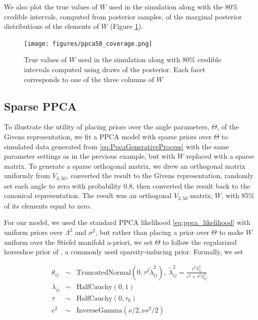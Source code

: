 \documentclass[ba]{imsart}
\numberwithin{equation}{section}
\theoremstyle{plain}
\begin{document}
\noindent We also plot the true values of $W$ used in the simulation along with the 80\% credible intervals, computed from posterior samples, of the marginal posterior distributions of the elements of $W$ (Figure \ref{fig:ppca50_coverage}). 

\begin{figure}[h]
\centering
\vspace{.1in}
\texttt{[image: figures/ppca50\_coverage.png]}
\vspace{.05in}
\caption{True values of $W$ used in the simulation along with 80\% credible intervals computed using draws of the posterior. Each facet corresponds to one of the three columns of $W$}
\label{fig:ppca50_coverage}
\end{figure}


\subsection{Sparse PPCA}
To illustrate the utility of placing priors over the angle parameters, $\Theta$, of the Givens representation, we fit a PPCA model with sparse priors over $\Theta$ to simulated data generated from \ref{eq:PpcaGenerativeProcess} with the same parameter settings as in the previous example, but with $W$ replaced with a sparse matrix. To generate a sparse orthogonal matrix, we drew an orthogonal matrix uniformly from $V_{3,50}$, converted the result to the Givens representation, randomly set each angle to zero with probability 0.8, then converted the result back to the canonical representation. The result was an orthogonal $V_{3,50}$ matrix, $W$, with 85\% of its elements equal to zero.

\noindent For our model, we used the standard PPCA likelihood \ref{eq:ppca_likelihood} with uniform priors over $\Lambda^2$ and $\sigma^2$, but rather than placing a prior over $\Theta$ to make $W$ uniform over the Stiefel manifold a-priori, we set $\Theta$ to follow the regularized horseshoe prior of \cite{piironen2017sparsity}, a commonly used sparsity-inducing prior. Formally, we set

\begin{eqnarray}
\theta_{ij} &\sim& \mathrm{TruncatedNormal}(0, \tau^2 \tilde{\lambda}_{ij}^2),\; \tilde{\lambda}_{ij}^2 = \frac{c^2 \lambda_{ij}^2}{c^2 + \tau^2 \lambda_{ij}^2}\\
\lambda_{ij} &\sim& \mathrm{Half Cauchy}(0,1)\nonumber \\
\tau &\sim& \mathrm{Half Cauchy}(0,\tau_0)\nonumber \\
c^2 &\sim& \mathrm{Inverse Gamma}(\nu/2, \nu s^2/2)\nonumber
\end{eqnarray}
\end{document}
